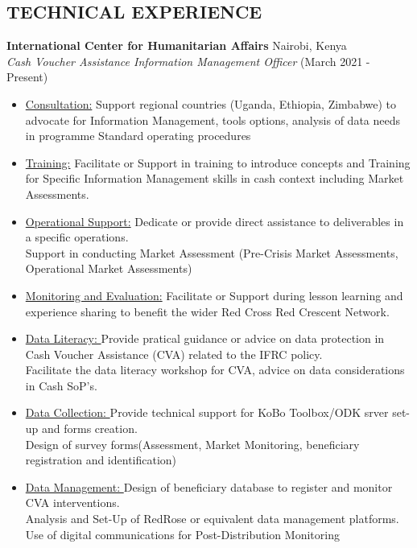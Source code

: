 \documentclass[line,margin,10pt]{res}
\begin{document}
\begin{resume}
\section{TECHNICAL EXPERIENCE}
\textbf{International Center for Humanitarian Affairs} \hfill Nairobi, Kenya\\
{\sl Cash Voucher Assistance Information Management Officer} \hfill (March 2021 - Present)
\begin{itemize} \itemsep -2pt
	\item \underline{Consultation:}
    Support regional countries (Uganda, Ethiopia, Zimbabwe) to advocate for Information Management, tools options, analysis of data needs in programme Standard operating procedures
    \item \underline{Training:}
    Facilitate or Support in training to introduce concepts and Training for Specific Information Management skills in cash context including Market Assessments.
    \item \underline{Operational Support:}
    Dedicate or provide direct assistance to deliverables in a specific operations.\\
    Support in conducting Market Assessment (Pre-Crisis Market Assessments, Operational Market Assessments)\\
    \item \underline{Monitoring and Evaluation:}
    Facilitate or Support during lesson learning and experience sharing to benefit the wider Red Cross Red Crescent Network.
    \item \underline{Data Literacy: }
    Provide pratical guidance or advice on data protection in Cash Voucher Assistance (CVA) related to the IFRC policy.\\
    Facilitate the data literacy workshop for CVA, advice on data considerations in Cash SoP's.\\
    \item \underline{Data Collection: }
    Provide technical support for KoBo Toolbox/ODK srver set-up and forms creation.\\
    Design of survey forms(Assessment, Market Monitoring, beneficiary registration and identification)\\
    \item \underline{Data Management: }
    Design of beneficiary database to register and monitor CVA interventions.\\
    Analysis and Set-Up of RedRose or equivalent data management platforms.\\
    Use of digital communications for Post-Distribution Monitoring\\

\end{itemize}
\end{resume}
\end{document}
